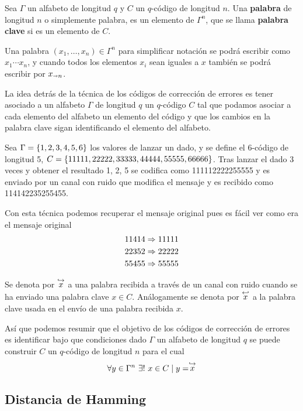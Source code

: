 \begin{definition}
	Sea $\Gamma$ un alfabeto de longitud $q$ y $C$ un $q$-código de longitud $n$.
	Una \textbf{palabra} de longitud $n$ o simplemente palabra, es un elemento de $\Gamma^n$, que se llama \textbf{palabra clave} si es un elemento de $C$.
\end{definition}

Una palabra $(x_1,\dots,x_n)\in\Gamma^n$ para simplificar notación se podrá escribir como $x_1\cdots x_n$, y cuando todos los elementos $x_i$ sean iguales a $x$ también se podrá escribir por $x_{\shortrightarrow n}$.

La idea detrás de la técnica de los códigos de corrección de errores es tener asociado a un alfabeto $\Gamma$ de longitud $q$ un $q$-código $C$ tal que podamos asociar a cada elemento del alfabeto un elemento del código y que los cambios en la palabra clave sigan identificando el elemento del alfabeto.

\begin{example}
	Sea $\Gamma=\left\{1, 2, 3, 4, 5, 6\right\}$ los valores de lanzar un dado, y se define el $6$-código de longitud 5, $C=\left\{11111, 22222, 33333, 44444, 55555, 66666\right\}$.
	Tras lanzar el dado 3 veces y obtener el resultado 1, 2, 5 se codifica como 111112222255555 y es enviado por un canal con ruido que modifica el mensaje y es recibido como 114142235255455.

	Con esta técnica podemos recuperar el mensaje original pues es fácil ver como era el mensaje original
	\begin{align*}
		11414 & \Rightarrow 11111 \\
		22352 & \Rightarrow 22222 \\
		55455 & \Rightarrow 55555
	\end{align*}
\end{example}

Se denota por $\stackrel{\hookrightarrow}{x}$ a una palabra recibida a través de un canal con ruido cuando se ha enviado una palabra clave $x\in C$.
Análogamente se denota por $\stackrel{\hookleftarrow}{x}$ a la palabra clave usada en el envío de una palabra recibida $x$.

Así que podemos resumir que el objetivo de los códigos de corrección de errores es identificar bajo que condiciones dado $\Gamma$ un alfabeto de longitud $q$ se puede construir $C$ un $q$-código de longitud $n$ para el cual
\[
	\forall y\in\Gamma^n\ \exists!\ x\in C \tq y = \push{x}
\]

\subsection{Distancia de Hamming}

